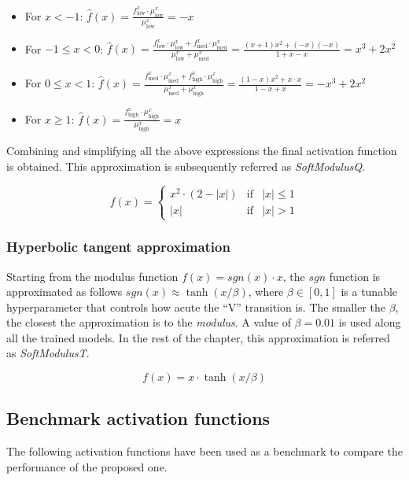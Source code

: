 \begin{itemize}
	\item For $x < -1$:  $\hat{f}(x)=\frac{f^x_{\text{low}} \cdot \mu^x_{\text{low}}}{\mu^x_{\text{low}}}=-x$

	\item For $-1\leq x < 0$:  $\hat{f}(x)=\frac{f^x_{\text{low}} \cdot \mu^x_{\text{low}} + f^x_{\text{med}} \cdot \mu^x_{\text{med}}}{\mu^x_{\text{low}} + \mu^x_{\text{med}}}=\frac{(x+1)x^2+(-x)(-x)}{1+x-x}=x^3 + 2x^2$

	\item For $0\leq x < 1$:  $\hat{f}(x)=\frac{f^x_{\text{med}} \cdot \mu^x_{\text{med}} + f^x_{\text{high}} \cdot \mu^x_{\text{high}}}{\mu^x_{\text{med}} + \mu^x_{\text{high}}}=\frac{(1-x)x^2+x\cdot x}{1-x+x}=-x^3 + 2x^2$

	\item For $x \geq 1$:  $\hat{f}(x)=\frac{f^x_{\text{high}} \cdot \mu^x_{\text{high}}}{\mu^x_{\text{high}}}=x$
\end{itemize}

Combining and simplifying all the above expressions the final activation function is obtained. This approximation is subsequently referred as \textit{SoftModulusQ}.


$$
f(x)= \left\{ \begin{array}{lcc}
x^2 \cdot (2-|x|) &  \text{if} & |x| \leq 1 \\
|x| &   \text{if}  & |x| > 1
\end{array}
\right.
$$


\subsubsection{Hyperbolic tangent approximation}
Starting from the modulus function $f(x)=sgn(x)\cdot x$, the $sgn$ function is approximated as follows $sgn(x) \approx \tanh(x/\beta)$, where $\beta \in [0, 1]$ is a tunable hyperparameter that controls how acute the ``V'' transition is. The smaller the $\beta$, the closest the approximation is to the \textit{modulus}. A value of $\beta=0.01$ is used along all the trained models. In the rest of the chapter, this approximation is referred as \textit{SoftModulusT}.

	$$f(x) = x \cdot \tanh(x/\beta)$$




\subsection{Benchmark activation functions}
The following activation functions have been used as a benchmark to compare the performance of the proposed one.


